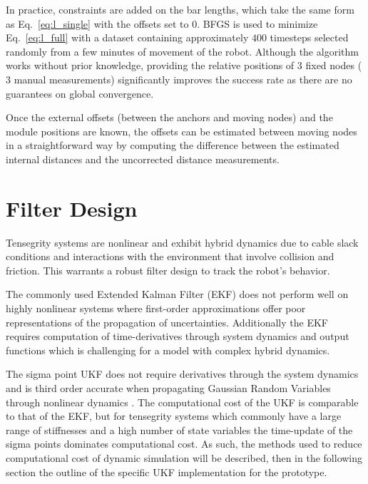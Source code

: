 {In practice, constraints are added on the bar lengths, which take the same form as Eq.~\ref{eq:l_single} with the offsets set to $0$.
BFGS is used to minimize Eq.~\ref{eq:l_full} with  a dataset containing approximately $400$ timesteps selected randomly from a few minutes of movement of the robot.
Although the algorithm works without prior knowledge, providing the relative positions of $3$ fixed nodes ($3$ manual measurements) significantly improves the success rate as there are no guarantees on global convergence.

Once the external offsets (between the anchors and moving nodes) and the module positions are known, the offsets can be estimated between moving nodes in a straightforward way by computing the difference between the estimated internal distances and the uncorrected distance measurements.




\section{Filter Design}
\label{txt:ukf}

Tensegrity systems are nonlinear and exhibit hybrid dynamics due to cable slack conditions and  interactions with the environment that involve collision and friction. This warrants a robust filter design to track the robot's behavior.

The commonly used Extended Kalman Filter (EKF) does not perform well on highly nonlinear systems where first-order approximations offer poor representations of the propagation of uncertainties.
Additionally the EKF requires computation of time-derivatives through system dynamics and output functions which is challenging for a model with complex hybrid dynamics. 

The sigma point UKF does not require derivatives through the system dynamics and is third order accurate when propagating Gaussian Random Variables through nonlinear dynamics \cite{wan2000unscented}. The computational cost of the UKF is comparable to that of the EKF, but for tensegrity systems which commonly have a large range of stiffnesses and a high number of state variables the time-update of the sigma points dominates computational cost. As such, the methods used to reduce computational cost of dynamic simulation will be described, then in the following section the outline of the specific UKF implementation for the \SB{} prototype.

}
